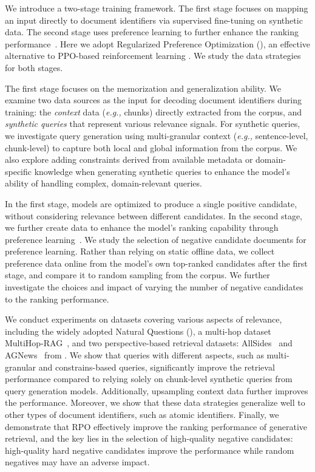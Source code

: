 We introduce a two-stage training framework.
The first stage focuses on mapping an input directly to document identifiers via supervised fine-tuning on synthetic data. The second stage uses preference learning to further enhance the ranking performance~\citep{zhou-etal-2023-enhancing-generative,DBLP:conf/aaai/00010WWL24}. Here we adopt Regularized Preference Optimization (\citealp[RPO]{DBLP:journals/corr/abs-2404-19733}), an effective alternative to PPO-based reinforcement learning \citep{DBLP:conf/nips/Ouyang0JAWMZASR22}.
We study the data strategies for both stages.

The first stage focuses on the memorization and generalization ability. 
We examine two data sources as the input for decoding document identifiers during training: the \emph{context} data (\textit{e.g.,} chunks) directly extracted from the corpus, and \emph{synthetic queries} that represent various relevance signals. For synthetic queries, we investigate query generation using multi-granular context (\textit{e.g.,} sentence-level, chunk-level) to capture both local and global information from the corpus. We also explore adding constraints derived from available metadata or domain-specific knowledge when generating synthetic queries to enhance the model's ability of handling complex, domain-relevant queries.


In the first stage, models are optimized to produce a single positive candidate, without considering relevance between different candidates. In the second stage, we further create data to enhance the model's ranking capability through preference learning~\citep{zhou-etal-2023-enhancing-generative,DBLP:conf/aaai/00010WWL24}. 
We study the selection of negative candidate documents for preference learning. Rather than relying on static offline data, we collect preference data online from the model's own top-ranked candidates after the first stage, and compare it to random sampling from the corpus.
We further investigate the choices and impact of varying the number of negative candidates to the ranking performance.


We conduct experiments on datasets covering various aspects of relevance, including the widely adopted Natural Questions (\citealp[NQ]{kwiatkowski-etal-2019-natural}), a multi-hop dataset MultiHop-RAG~\citep{DBLP:journals/corr/abs-2401-15391}, and two perspective-based retrieval datasets: AllSides~\citep{baly-etal-2020-detect} and AGNews~\citep{DBLP:conf/nips/YuZZMRKSZ23} from \citet{DBLP:journals/corr/abs-2405-02714}.
We show that queries with different aspects, such as multi-granular and constrains-based queries, significantly improve the retrieval performance compared to relying solely on chunk-level synthetic queries from query generation models. Additionally, upsampling context data further improves the performance.
Moreover, we show that these data strategies generalize well to other types of document identifiers, such as atomic identifiers.
Finally, we demonstrate that RPO effectively improve the ranking performance of generative retrieval, and the key lies in the selection of high-quality negative candidates: high-quality hard negative candidates improve the performance while random negatives may have an adverse impact.

